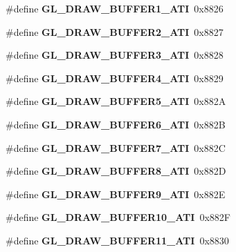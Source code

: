 \begin{DoxyCompactItemize}
\item 
\#define {\bfseries G\+L\+\_\+\+D\+R\+A\+W\+\_\+\+B\+U\+F\+F\+E\+R1\+\_\+\+A\+T\+I}~0x8826\label{_s_d_l__opengl_8h_ad376527a87f1cd365e77a0be967f437d}

\item 
\#define {\bfseries G\+L\+\_\+\+D\+R\+A\+W\+\_\+\+B\+U\+F\+F\+E\+R2\+\_\+\+A\+T\+I}~0x8827\label{_s_d_l__opengl_8h_a9d8db54c6ea36fd542a7598c1d7f894f}

\item 
\#define {\bfseries G\+L\+\_\+\+D\+R\+A\+W\+\_\+\+B\+U\+F\+F\+E\+R3\+\_\+\+A\+T\+I}~0x8828\label{_s_d_l__opengl_8h_a28711e3d23ff6068bdfcf457a60aae92}

\item 
\#define {\bfseries G\+L\+\_\+\+D\+R\+A\+W\+\_\+\+B\+U\+F\+F\+E\+R4\+\_\+\+A\+T\+I}~0x8829\label{_s_d_l__opengl_8h_a0b01b29697616c7aafb831706e09eaec}

\item 
\#define {\bfseries G\+L\+\_\+\+D\+R\+A\+W\+\_\+\+B\+U\+F\+F\+E\+R5\+\_\+\+A\+T\+I}~0x882\+A\label{_s_d_l__opengl_8h_ab7f9ea52a6dfd1eefb41446d6d6acbd7}

\item 
\#define {\bfseries G\+L\+\_\+\+D\+R\+A\+W\+\_\+\+B\+U\+F\+F\+E\+R6\+\_\+\+A\+T\+I}~0x882\+B\label{_s_d_l__opengl_8h_a40f5e813c82ba1ed34dca87d8dd48972}

\item 
\#define {\bfseries G\+L\+\_\+\+D\+R\+A\+W\+\_\+\+B\+U\+F\+F\+E\+R7\+\_\+\+A\+T\+I}~0x882\+C\label{_s_d_l__opengl_8h_a651b8b2a2de6ba2a3f5dc3835ebf0206}

\item 
\#define {\bfseries G\+L\+\_\+\+D\+R\+A\+W\+\_\+\+B\+U\+F\+F\+E\+R8\+\_\+\+A\+T\+I}~0x882\+D\label{_s_d_l__opengl_8h_af90310e18ccf2d6d3f6ca0d96f0cc860}

\item 
\#define {\bfseries G\+L\+\_\+\+D\+R\+A\+W\+\_\+\+B\+U\+F\+F\+E\+R9\+\_\+\+A\+T\+I}~0x882\+E\label{_s_d_l__opengl_8h_a243fe809c9e8090cdb88d7f1da74f535}

\item 
\#define {\bfseries G\+L\+\_\+\+D\+R\+A\+W\+\_\+\+B\+U\+F\+F\+E\+R10\+\_\+\+A\+T\+I}~0x882\+F\label{_s_d_l__opengl_8h_ae520c3303d2bf5210533f16189fd4b7e}

\item 
\#define {\bfseries G\+L\+\_\+\+D\+R\+A\+W\+\_\+\+B\+U\+F\+F\+E\+R11\+\_\+\+A\+T\+I}~0x8830\label{_s_d_l__opengl_8h_a792115cbd30775175925314343b4942e}


\end{DoxyCompactItemize}
